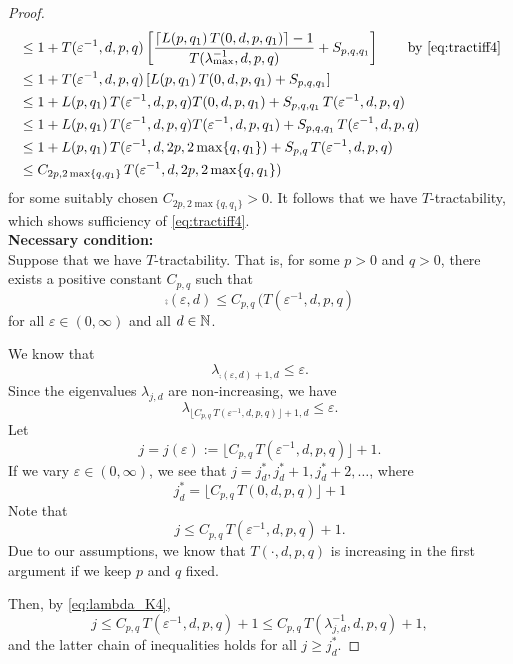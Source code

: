 \documentclass[11pt,a4paper]{article}
\begin{document}
\begin{proof}
\begin{align*}
       & \le 1+ T(\varepsilon^{-1},d,p,q)\left[ \frac{\lceil L(p,q_1)\, T(0,d,p,q_1)\rceil-1}{T(\lambda_{\max}^{-1},d,p,q)} + S_{p,q,q_1}\right]
        \qquad \text{by \eqref{eq:tractiff4}} \\
       & \le 1+ T(\varepsilon^{-1},d,p,q)\left[L(p,q_1)\, T(0,d,p,q_1) + S_{p,q,q_1}\right]\\
       & \le 1+L(p,q_1)\,T(\varepsilon^{-1},d,p,q) T(0,d,p,q_1) + S_{p,q,q_1}\, T(\varepsilon^{-1},d,p,q)\\
       & \le 1+L(p,q_1)\,T(\varepsilon^{-1},d,p,q) T(\varepsilon^{-1},d,p,q_1) + S_{p,q,q_1}\, T(\varepsilon^{-1},d,p,q)\\
       & \le 1+L(p,q_1)\,T(\varepsilon^{-1},d,2p,2\max\{q,q_1\})  + S_{p,q}\, T(\varepsilon^{-1},d,p,q)  \\
       & \le C_{2p,2\max\{q,q_1\}} \,T(\varepsilon^{-1},d,2p,2\max\{q,q_1\})
\end{align*}
for some suitably chosen $C_{2p,2\max\{q,q_1\}}>0$. It follows that we have $T$-tractability, which shows sufficiency of \eqref{eq:tractiff4}. \\



\textbf{Necessary condition:}\\
Suppose that we have
$T$-tractability. That is, for some $p>0$ and $q>0$, there exists a positive constant $C_{p,q}$ such that
\[
\comp(\varepsilon,d)\le C_{p,q}\, (T(\varepsilon^{-1},d,p,q)
\]
for all $\varepsilon\in (0,\infty)$ and all $d\in\mathbb{N}$.


We know that
\[
\lambda_{\comp(\varepsilon,d)+1,d}\le \varepsilon.
\]
Since the eigenvalues $\lambda_{j,d}$ are non-increasing, we have
\begin{equation}\label{eq:lambda_K4}
\lambda_{\lfloor C_{p,q}\, T(\varepsilon^{-1},d,p,q)\rfloor +1,d}\le \varepsilon.
\end{equation}
Let
\[
j=j (\varepsilon):= \lfloor C_{p,q}\, T(\varepsilon^{-1},d,p,q)\rfloor +1.
\]
If we vary $\varepsilon\in (0,\infty)$, we see that $j=j_d^*, j_d^*+1, j_d^*+2,\ldots$, where
\[
  j_d^*=\lfloor C_{p,q}\, T(0,d,p,q)\rfloor +1
\]
Note that
\[
j\le C_{p,q}\, T(\varepsilon^{-1},d,p,q) +1.
\]
Due to our assumptions, we know that
$T(\cdot,d,p,q)$ is increasing in the first argument if
we keep $p$ and $q$ fixed.

Then, by \eqref{eq:lambda_K4},
\[
j \le C_{p,q}\, T(\varepsilon^{-1},d,p,q) +1 \le C_{p,q}\, T(\lambda_{j,d}^{-1},d,p,q) +1,
\]
and the latter chain of inequalities holds for all $j\ge j_d^*$.


\end{proof}
\end{document}
